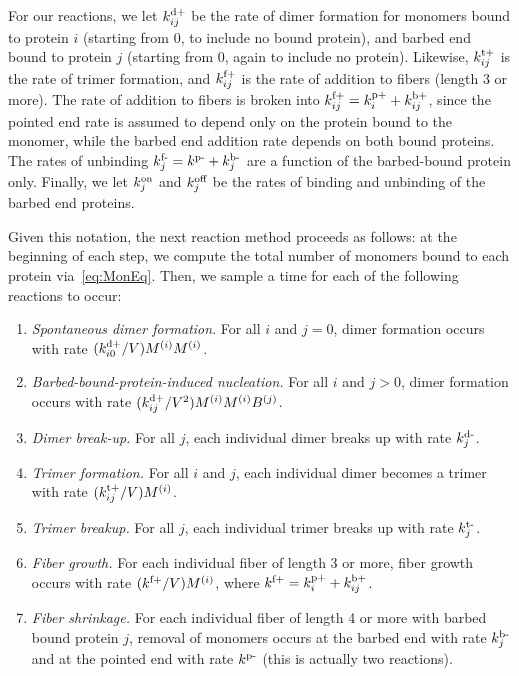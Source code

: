 \documentclass[11pt]{article}
\renewcommand{\i}[1]{{#1}^{(i)}}
\renewcommand{\j}[1]{{#1}^{(j)}}
\newcommand{\z}[1]{{#1}^{(0)}}
\begin{document}
\begin{appendices}
For our reactions, we let $k^\text{d+}_{ij}$ be the rate of dimer formation for monomers bound to protein $i$ (starting from 0, to include no bound protein), and barbed end bound to protein $j$ (starting from 0, again to include no protein). Likewise, $k^\text{t+}_{ij}$ is the rate of trimer formation, and $k^\text{f+}_{ij}$ is the rate of addition to fibers (length 3 or more). The rate of addition to fibers is broken into $k^\text{f+}_{ij}=k^\text{p+}_i + k^\text{b+}_{ij}$, since the pointed end rate is assumed to depend only on the protein bound to the monomer, while the barbed end addition rate depends on both bound proteins. The rates of unbinding $k^\text{f-}_j=k^\text{p-}+k^\text{b-}_j$ are a function of the barbed-bound protein only. Finally, we let $k^\text{on}_j$ and $k^\text{off}_j$ be the rates of binding and unbinding of the barbed end proteins. 

Given this notation, the next reaction method proceeds as follows: at the beginning of each step, we compute the total number of monomers bound to each protein via\ \eqref{eq:MonEq}. Then, we sample a time for each of the following reactions to occur:
\begin{enumerate}
\item \emph{Spontaneous dimer formation}. For all $i$ and $j=0$, dimer formation occurs with rate $(\kdp_{i0}/V)\i M \i M$. %
\item \emph{Barbed-bound-protein-induced nucleation.} For all $i$ and $j> 0$, dimer formation occurs with rate $(\kdp_{ij}/V^2)\i M \i M \j B$. %
\item \emph{Dimer break-up.} For all $j$, each individual dimer breaks up with rate $k^\text{d-}_j$. %
\item \emph{Trimer formation.} For all $i$ and $j$, each individual dimer becomes a trimer with rate $(\ktrp_{ij}/V)\i M$.
\item \emph{Trimer breakup.} For all $j$, each individual trimer breaks up with rate $k^\text{t-}_j$.
\item \emph{Fiber growth.} For each individual fiber of length 3 or more, fiber growth occurs with rate $(\kfp/V) \i M$, where $k^\text{f+}=k^\text{p+}_i+k^\text{b+}_{ij}$.
\item \emph{Fiber shrinkage.} For each individual fiber of length 4 or more with barbed bound protein $j$, removal of monomers occurs at the barbed end with rate $k^\text{b-}_j$ and at the pointed end with rate $k^\text{p-}$ (this is actually two reactions). 

\end{enumerate}
\end{appendices}
\end{document}
